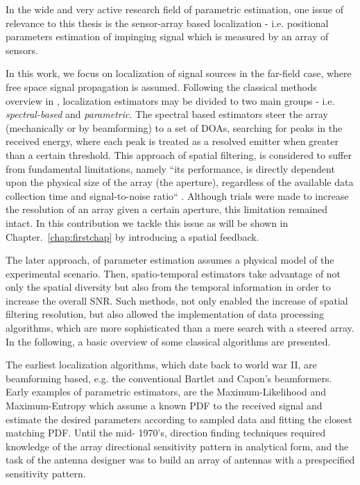 In the wide and very active research field of parametric estimation, one issue of relevance to this thesis is the sensor-array based localization - i.e. positional parameters estimation of impinging signal which is measured by an array of sensors.
\par 
In this work, we focus on localization of signal sources in the far-field case, where free space signal propagation is assumed.
Following the classical methods overview in \cite{krim1996two}, localization estimators may be divided to two main groups - i.e. \textit{spectral-based} and \textit{parametric}.
The spectral based estimators steer the array (mechanically or by beamforming) to a set of DOAs, searching for peaks in the received energy, where each peak is treated as a resolved emitter when greater than a certain threshold.
This approach of spatial filtering, is considered to suffer from fundamental
limitations, namely ``its performance, is directly dependent upon the physical size of the array (the aperture), regardless of the available data collection time and signal-to-noise ratio`` \cite{krim1996two}.
Although trials were made to increase the resolution of an array given a certain aperture, this limitation remained intact.
In this contribution we tackle this issue as will be shown in Chapter.~\ref{chap:firstchap} by introducing a spatial feedback.
\par
The later approach, of parameter estimation assumes a physical model of the experimental scenario.
Then, spatio-temporal estimators take advantage of not only the spatial diversity but also from the temporal information in order to increase the overall SNR.
Such methods, not only enabled the increase of spatial filtering resolution, but also allowed the implementation of data processing algorithms, which are more sophisticated than a mere search with a steered array.
In the following, a basic overview of some classical algorithms are presented.
\par
The earliest localization algorithms, which date back to world war II, are beamforming based, e.g. the conventional Bartlet \cite{van2004optimum} and Capon's \cite{capon1969high} beamformers.
Early examples of parametric estimators, are the Maximum-Likelihood \cite{macdonald1969optimum,schweppe1968sensor} and Maximum-Entropy \cite{ables1974maximum} which assume a known PDF to the received signal and estimate the desired parameters according to sampled data and fitting the closest matching PDF.
Until the mid- 1970's, direction finding techniques required knowledge of the array directional sensitivity pattern in analytical form, and the task of the antenna designer was to build an array of antennas with a prespecified sensitivity pattern.

